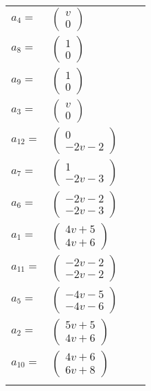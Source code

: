 \documentclass[1p]{elsarticle_modified}
\theoremstyle{definition}
\begin{document}
\begin{tabular}{m{7pt} m{180pt} m{7pt} m{180pt} }
\flushright $a_{4}=$&$\begin{pmatrix}v\\0\end{pmatrix}$ \\
\flushright $a_{8}=$&$\begin{pmatrix}1\\0\end{pmatrix}$ \\
\flushright $a_{9}=$&$\begin{pmatrix}1\\0\end{pmatrix}$ \\
\flushright $a_{3}=$&$\begin{pmatrix}v\\0\end{pmatrix}$ \\
\flushright $a_{12}=$&$\begin{pmatrix}0\\-2 v-2\end{pmatrix}$ \\
\flushright $a_{7}=$&$\begin{pmatrix}1\\-2 v-3\end{pmatrix}$ \\
\flushright $a_{6}=$&$\begin{pmatrix}-2 v-2\\-2 v-3\end{pmatrix}$ \\
\flushright $a_{1}=$&$\begin{pmatrix}4 v+5\\4 v+6\end{pmatrix}$ \\
\flushright $a_{11}=$&$\begin{pmatrix}-2 v-2\\-2 v-2\end{pmatrix}$ \\
\flushright $a_{5}=$&$\begin{pmatrix}-4 v-5\\-4 v-6\end{pmatrix}$ \\
\flushright $a_{2}=$&$\begin{pmatrix}5 v+5\\4 v+6\end{pmatrix}$ \\
\flushright $a_{10}=$&$\begin{pmatrix}4 v+6\\6 v+8\end{pmatrix}$\\&\end{tabular}
\end{document}
